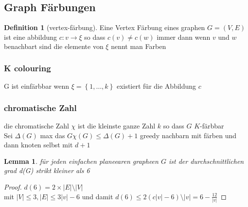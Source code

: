 \documentclass[a4paper]{article}
\newtheorem{lemma}[theorem]{Lemma}
\theoremstyle{definition}
\newtheorem*{definition}{Definition}
\theoremstyle{remark}
\begin{document}
\subsection{Graph Färbungen}
\label{sub:graph_farbungen}

\begin{definition}[vertex-färbung]
  Eine Vertex Färbung eines graphen $G=(V,E)$ ist eine abbildung $c: v \rightarrow \xi $ so dass $c(v) \neq c(w)$ immer dann wenn $v$ und $w$ benachbart sind die elemente von $\xi$ nennt man Farben
  \subsubsection{K colouring}
  \label{ssub:k_colouring}
  
  G ist einfärbbar wenn $\xi= \left\{ 1,\dots,k \right\} $ existiert für die Abbildung $c$ 
  \subsubsection{chromatische Zahl}
  \label{ssub:chromatische_zahl}
  
  die chromatische Zahl $\chi$ ist die kleinste ganze Zahl $k$ so dass $G$  $K$-färbbar\\

  Sei $\Delta (G)$ max das $G \chi(G) \leq \Delta (G) +1$
  greedy nachbarn mit färben und dann knoten selbst mit $d+1$
  \begin{lemma}
    für jeden einfachen planeearen grapheen $G$ ist der durchschnittlichen grad d(G) strikt kleiner als 6
  \end{lemma}
  \begin{proof}
    $d(6)= 2\times |E| \setminus |V|$ \\
    mit $|V| \leq 3 , |E| \leq 3|v|-6$ und damit 
    $d(6) \leq 2(c|v|-6)\setminus |v|= 6-\frac{12}{|v|}$
  \end{proof}
\end{definition}
\end{document}
